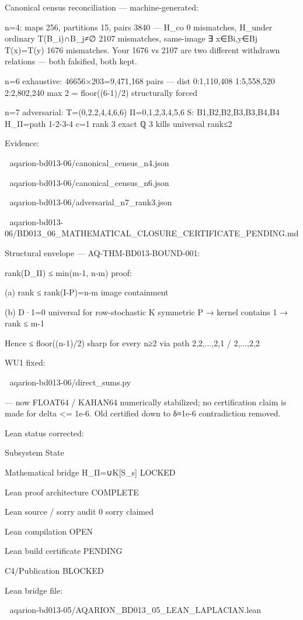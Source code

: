 Canonical census reconciliation — machine-generated:


n=4: maps 256, partitions 15, pairs 3840 — H_co 0 mismatches, H_under ordinary T(B_i)∩B_j≠∅ 2107 mismatches, same-image ∃ x∈Bi,y∈Bj T(x)=T(y) 1676 mismatches. Your 1676 vs 2107 are two different withdrawn relations — both falsified, both kept.

n=6 exhaustive: 46656×203=9,471,168 pairs — dist 0:1,110,408 1:5,558,520 2:2,802,240 max 2 = floor((6-1)/2) structurally forced

n=7 adversarial: T=(0,2,2,4,4,6,6) Π={{0,1},{2,3},{4,5},{6}} S: {B1,B2},{B2,B3},{B3,B4},{B4} H_Π=path 1-2-3-4 c=1 rank 3 exact ℚ 3 kills universal rank≤2


Evidence:


📎 aqarion-bd013-06/canonical_census_n4.json


📎 aqarion-bd013-06/canonical_census_n6.json


📎 aqarion-bd013-06/adversarial_n7_rank3.json


📎 aqarion-bd013-06/BD013_06_MATHEMATICAL_CLOSURE_CERTIFICATE_PENDING.md

Structural envelope — AQ-THM-BD013-BOUND-001:


rank(D_Π) ≤ min(m-1, n-m) proof:

(a) rank ≤ rank(I-P)=n-m image containment

(b) D·1=0 universal for row-stochastic K symmetric P → kernel contains 1 → rank ≤ m-1

Hence ≤ floor((n-1)/2) sharp for every n≥2 via path 2,2,...,2,1 / 2,...,2,2


WU1 fixed:


📎 aqarion-bd013-06/direct_sums.py

— now FLOAT64 / KAHAN64 numerically stabilized; no certification claim is made for delta <= 1e-6. Old certified down to δ≈1e-6 contradiction removed.


Lean status corrected:


Subsystem	State


Mathematical bridge H_Π=∪K[S_s]	LOCKED

Lean proof architecture	COMPLETE

Lean source / sorry audit	0 sorry claimed

Lean compilation	OPEN

Lean build certificate	PENDING

C4/Publication	BLOCKED

Lean bridge file:


📎 aqarion-bd013-05/AQARION_BD013_05_LEAN_LAPLACIAN.lean

